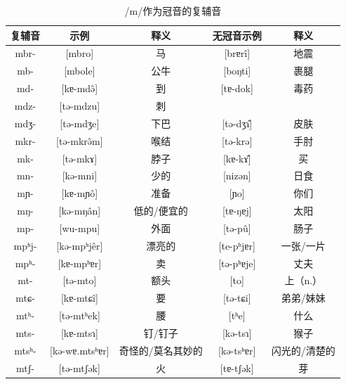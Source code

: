 \begin{table}[H]
\vspace{5pt}
    \centering
    \caption{/m/作为冠音的复辅音}
    \label{mpre}
\begin{tabular}{c|cccc}
     \toprule
复辅音   & 示例              & 释义   & 无冠音示例          & 释义        \\
     \midrule
	mbr-  & {[}mbro{]}         & 马         & {[}brɐrî{]}   & 地震      \\
mb-   & {[}mbole{]}        & 公牛        & {[}boŋti{]}    & 裹腿      \\
md-   & {[}kɐ-mdə̂{]}      & 到         & {[}tɐ-dok{]}   & 毒药      \\
mdz-  & {[}tə-mdzu{]}      & 刺         &                &         \\
mdʒ-  & {[}tə-mdʒe{]}      & 下巴        & {[}tə-dʒɿ̂{]}  & 皮肤      \\
mkr-  & {[}tə-mkrə̂m{]}    & 喉结        & {[}tə-krə{]}   & 手肘      \\
mk-   & {[}tə-mkɤ{]}       & 脖子        & {[}kɐ-kɤ̂{]}   & 买       \\
mn-   & {[}kə-mni{]}       & 少的        & {[}nizən{]}    & 日食      \\
mɲ-   & {[}kɐ-mɲô{]}      & 准备        & {[}ɲo{]}       & 你们      \\
mŋ-   & {[}kə-mŋân{]}     & 低的/便宜的    & {[}tɐ-ŋɐj{]}   & 太阳      \\
mp-   & {[}wu-mpu{]}       & 外面        & {[}tə-pû{]}   & 肠子      \\
mpʰj- & {[}kə-mpʰjêr{]}   & 漂亮的       & {[}te-pʰjɐr{]} & 一张/一片   \\
mpʰ-  & {[}kɐ-mpʰɐr{]}     & 卖         & {[}tə-pʰɐje{]} & 丈夫      \\
mt-   & {[}tə-mto{]}       & 额头        & {[}to{]}       & 上（n.）   \\
mtɕ-  & {[}kɐ-mtɕî{]}     & 要         & {[}tə-tɕi{]}   & 弟弟/妹妹   \\
mtʰ-  & {[}tə-mtʰek{]}     & 腰         & {[}tʰe{]}      & 什么      \\
mts-  & {[}kɐ-mtsɿ{]}      & 钉/钉子      & {[}kə-tsɿ{]}   & 猴子      \\
mtsʰ- & {[}kə-wɐ.mtsʰɐr{]} & 奇怪的/莫名其妙的 & {[}kə-tsʰɐr{]} & 闪光的/清楚的 \\
mtʃ-  & {[}tə-mtʃək{]}     & 火         & {[}tɐ-tʃək{]}  & 芽      \\ 
   \bottomrule
\end{tabular}
\end{table}

